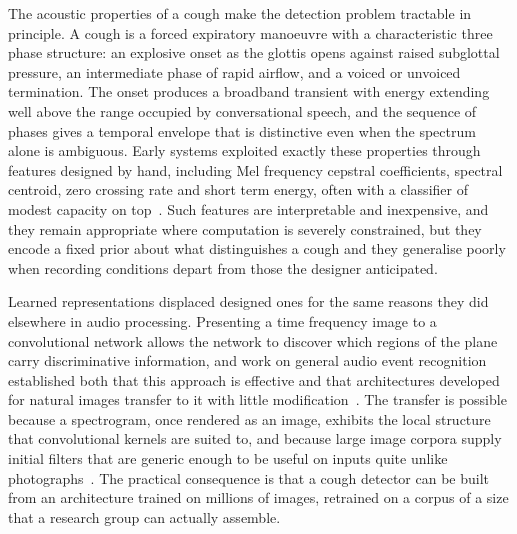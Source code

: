 \documentclass[pdflatex,sn-mathphys-num]{sn-jnl}
\begin{document}
The acoustic properties of a cough make the detection problem tractable in
principle. A cough is a forced expiratory manoeuvre with a characteristic
three phase structure: an explosive onset as the glottis opens against raised
subglottal pressure, an intermediate phase of rapid airflow, and a voiced or
unvoiced termination. The onset produces a broadband transient with energy
extending well above the range occupied by conversational speech, and the
sequence of phases gives a temporal envelope that is distinctive even when the
spectrum alone is ambiguous. Early systems exploited exactly these properties
through features designed by hand, including Mel frequency cepstral
coefficients, spectral centroid, zero crossing rate and short term energy,
often with a classifier of modest capacity on
top~\cite{swarnkar2013, hoyosbarcelo2018, mongealvarez2019}. Such features are
interpretable and inexpensive, and they remain appropriate where computation is
severely constrained, but they encode a fixed prior about what distinguishes a
cough and they generalise poorly when recording conditions depart from those
the designer anticipated.

Learned representations displaced designed ones for the same reasons they did
elsewhere in audio processing. Presenting a time frequency image to a
convolutional network allows the network to discover which regions of the
plane carry discriminative information, and work on general audio event
recognition established both that this approach is effective and that
architectures developed for natural images transfer to it with little
modification~\cite{piczak2015, hershey2017, salamon2017}. The transfer is
possible because a spectrogram, once rendered as an image, exhibits the local
structure that convolutional kernels are suited to, and because large image
corpora supply initial filters that are generic enough to be useful on inputs
quite unlike photographs~\cite{deng2009, pan2010}. The practical consequence is
that a cough detector can be built from an architecture trained on millions of
images, retrained on a corpus of a size that a research group can actually
assemble.
\end{document}
